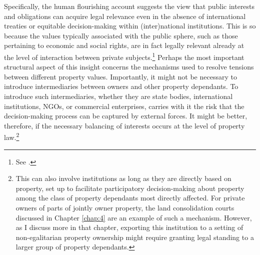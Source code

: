 Specifically, the human flourishing account suggests the view that public interests and obligations can acquire legal relevance even in the absence of international treaties or equitable decision-making within (inter)national institutions. This is so because the values typically associated with the public sphere, such as those pertaining to economic and social rights, are in fact legally relevant already at the level of interaction between private subjects.\footnote{See \cite[1295-1296]{alexander14}.}  Perhaps the most important structural aspect of this insight concerns the mechanisms used to resolve tensions between different property values. Importantly, it might not be necessary to introduce intermediaries between owners and other property dependants. To introduce such intermediaries, whether they are state bodies, international institutions, NGOs, or commercial enterprises, carries with it the risk that the decision-making process can be captured by external forces. It might be better, therefore, if the necessary balancing of interests occurs at the level of property law.\footnote{This can also involve institutions as long as they are directly based on property, set up to facilitate participatory decision-making about property among the class of property dependants most directly affected. For private owners of parts of jointly owner property, the land consolidation courts discussed in Chapter \ref{chap:4} are an example of such a mechanism. However, as I discuss more in that chapter, exporting this institution to a setting of non-egalitarian property ownership might require granting legal standing to a larger group of property dependants.}

